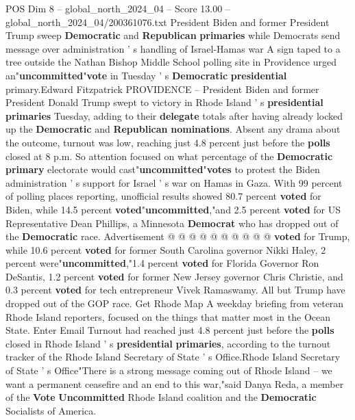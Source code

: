 \begin{textsample}{POS Dim 8 – global\_north\_2024\_04 – Score 13.00 – global\_north\_2024\_04/200361076.txt}  \label{ex:f8_pos_054}
President Biden and former President Trump sweep \textbf{Democratic} and \textbf{Republican} \textbf{primaries} while Democrats send message over administration ' s handling of Israel-Hamas war A sign taped to a tree outside the Nathan Bishop Middle School polling site in Providence urged an"\textbf{uncommitted}"\textbf{vote} in Tuesday ' s \textbf{Democratic} \textbf{presidential} primary.Edward Fitzpatrick PROVIDENCE -- President Biden and former President Donald Trump swept to victory in Rhode Island ' s \textbf{presidential} \textbf{primaries} Tuesday, adding to their \textbf{delegate} totals after having already locked up the \textbf{Democratic} and \textbf{Republican} \textbf{nominations}.
Absent any drama about the outcome, turnout was low, reaching just 4.8 percent just before the \textbf{polls} closed at 8 p.m.
So attention focused on what percentage of the \textbf{Democratic} \textbf{primary} electorate would cast"\textbf{uncommitted}"\textbf{votes} to protest the Biden administration ' s support for Israel ' s war on Hamas in Gaza.
With 99 percent of polling places reporting, unofficial results showed 80.7 percent \textbf{voted} for Biden, while 14.5 percent \textbf{voted}"\textbf{uncommitted},"and 2.5 percent \textbf{voted} for US Representative Dean Phillips, a Minnesota \textbf{Democrat} who has dropped out of the \textbf{Democratic} race.
Advertisement @ @ @ @ @ @ @ @ @ @ \textbf{voted} for Trump, while 10.6 percent \textbf{voted} for former South Carolina governor Nikki Haley, 2 percent were"\textbf{uncommitted},"1.4 percent \textbf{voted} for Florida Governor Ron DeSantis, 1.2 percent \textbf{voted} for former New Jersey governor Chris Christie, and 0.3 percent \textbf{voted} for tech entrepreneur Vivek Ramaswamy.
All but Trump have dropped out of the GOP race.
Get Rhode Map A weekday briefing from veteran Rhode Island reporters, focused on the things that matter most in the Ocean State.
Enter Email Turnout had reached just 4.8 percent just before the \textbf{polls} closed in Rhode Island ' s \textbf{presidential} \textbf{primaries}, according to the turnout tracker of the Rhode Island Secretary of State ' s Office.Rhode Island Secretary of State ' s Office"There is a strong message coming out of Rhode Island -- we want a permanent ceasefire and an end to this war,"said Danya Reda, a member of the \textbf{Vote} \textbf{Uncommitted} Rhode Island coalition and the \textbf{Democratic} Socialists of America.

\end{textsample}
